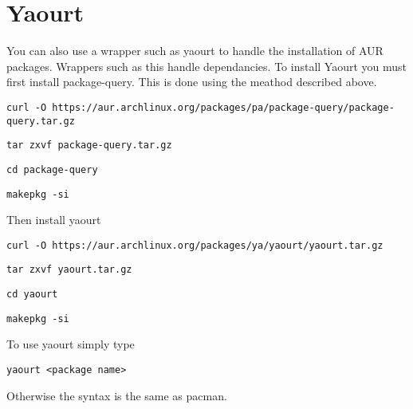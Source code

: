 \documentclass[12pt]{article}
\begin{document}
  \section*{Yaourt}
    You can also use a wrapper such as yaourt to handle the installation of AUR
    packages. Wrappers such as this handle dependancies.
    To install Yaourt you must first install package-query. This is done using
    the meathod described above.

    \begin{verbatim}curl -O https://aur.archlinux.org/packages/pa/package-query/package-query.tar.gz\end{verbatim}
    \begin{verbatim}tar zxvf package-query.tar.gz\end{verbatim}
    \begin{verbatim}cd package-query\end{verbatim}
    \begin{verbatim}makepkg -si\end{verbatim}

    Then install yaourt
    \begin{verbatim}curl -O https://aur.archlinux.org/packages/ya/yaourt/yaourt.tar.gz\end{verbatim}
    \begin{verbatim}tar zxvf yaourt.tar.gz\end{verbatim}
    \begin{verbatim}cd yaourt\end{verbatim}
    \begin{verbatim}makepkg -si \end{verbatim}

    To use yaourt simply type
    \begin{verbatim}yaourt <package name>\end{verbatim}
    Otherwise the syntax is the same as pacman.
\end{document}
